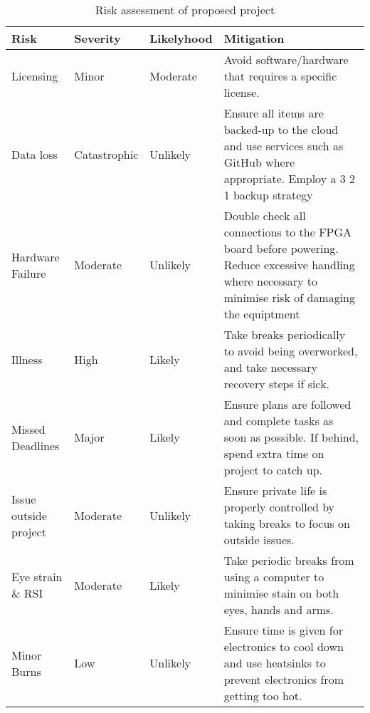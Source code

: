 \begin{table}[hbt!]
    \centering%
    \caption{ Risk assessment of proposed project}\label{table:milestones}
        \begin{tabularx}{\textwidth}{ lllX }
            \hline
            Risk       & Severity & Likelyhood & Mitigation  \\ \hline

            Licensing & Minor & Moderate & Avoid software/hardware that requires a specific license. \\
            Data loss & Catastrophic & Unlikely & Ensure all items are backed-up to the cloud and use services such as GitHub where appropriate. Employ a 3 2 1 backup strategy \\
            Hardware Failure & Moderate & Unlikely & Double check all connections to the FPGA board before powering. Reduce excessive handling where necessary to minimise risk of damaging the equiptment \\
            Illness & High & Likely & Take breaks periodically to avoid being overworked, and take necessary recovery steps if sick. \\
            Missed Deadlines & Major & Likely & Ensure plans are followed and complete tasks as soon as possible. If behind, spend extra time on project to catch up.\\
            
            Issue outside project & Moderate & Unlikely & Ensure private life is properly controlled by taking breaks to focus on outside issues. \\
            Eye strain \& RSI & Moderate & Likely & Take periodic breaks from using a computer to minimise stain on both eyes, hands and arms. \\
            Minor Burns & Low & Unlikely & Ensure time is given for electronics to cool down and use heatsinks to prevent electronics from getting too hot. \\ 
            \hline
            \end{tabularx}
    \end{table}
     
    